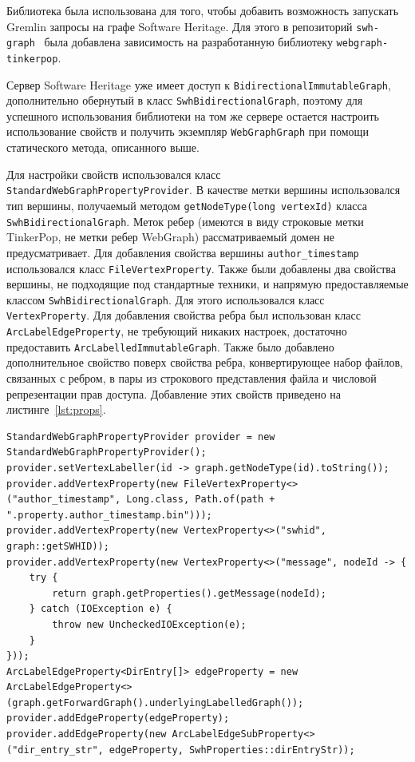 \documentclass[times,specification,annotation]{itmo-student-thesis}
\begin{document}
Библиотека была использована для того, чтобы добавить возможность запускать Gremlin запросы на графе Software Heritage. Для этого в репозиторий \texttt{swh-graph}~\cite{swh-graph} была добавлена зависимость на разработанную библиотеку \texttt{webgraph-tinkerpop}.

Сервер Software Heritage уже имеет доступ к \texttt{BidirectionalImmutableGraph}, дополнительно обернутый в класс \texttt{SwhBidirectionalGraph}, поэтому для успешного использования библиотеки на том же сервере остается настроить использование свойств и получить экземпляр \texttt{WebGraphGraph} при помощи статического метода, описанного выше.

Для настройки свойств использовался класс \texttt{StandardWebGraphPropertyProvider}. В качестве метки вершины использовался тип вершины, получаемый методом \texttt{getNodeType(long vertexId)} класса \texttt{SwhBidirectionalGraph}. Меток ребер (имеются в виду строковые метки TinkerPop, не метки ребер WebGraph) рассматриваемый домен не предусматривает. Для добавления свойства вершины \texttt{author\_timestamp} использовался класс \texttt{FileVertexProperty}. Также были добавлены два свойства вершины, не подходящие под стандартные техники, и напрямую предоставляемые классом \texttt{SwhBidirectionalGraph}. Для этого использовался класс \texttt{VertexProperty}.
Для добавления свойства ребра был использован класс \texttt{ArcLabelEdgeProperty}, не требующий никаких настроек, достаточно предоставить \texttt{ArcLabelledImmutableGraph}. Также было добавлено дополнительное свойство поверх свойства ребра, конвертирующее набор файлов, связанных с ребром, в пары из строкового представления файла и числовой репрезентации прав доступа. Добавление этих свойств приведено на листинге~\ref{lst:props}.

\begin{lstlisting}[float=H,caption={Добавление свойств для графа Software Heritage},label={lst:props}]
StandardWebGraphPropertyProvider provider = new StandardWebGraphPropertyProvider();
provider.setVertexLabeller(id -> graph.getNodeType(id).toString());
provider.addVertexProperty(new FileVertexProperty<>("author_timestamp", Long.class, Path.of(path + ".property.author_timestamp.bin")));
provider.addVertexProperty(new VertexProperty<>("swhid", graph::getSWHID));
provider.addVertexProperty(new VertexProperty<>("message", nodeId -> {
    try {
        return graph.getProperties().getMessage(nodeId);
    } catch (IOException e) {
        throw new UncheckedIOException(e);
    }
}));
ArcLabelEdgeProperty<DirEntry[]> edgeProperty = new ArcLabelEdgeProperty<>(graph.getForwardGraph().underlyingLabelledGraph());
provider.addEdgeProperty(edgeProperty);
provider.addEdgeProperty(new ArcLabelEdgeSubProperty<>("dir_entry_str", edgeProperty, SwhProperties::dirEntryStr));
\end{lstlisting}
\end{document}
